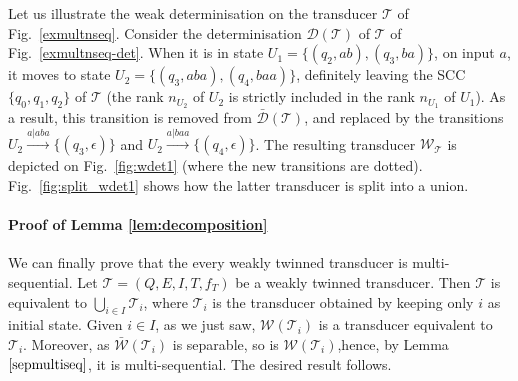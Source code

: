 \documentclass[envcountsame]{llncs}
\newcommand\tra{\mathcal{T}}
\begin{document}
\begin{example}
Let us illustrate the weak determinisation on the transducer $\tra$ of
Fig.~\ref{exmultnseq}. Consider the determinisation
$\mathcal{D}(\tra)$ of $\tra$ of Fig.~\ref{exmultnseq-det}.
When it is in state $U_1 = \{(q_2,ab),(q_3,ba)\}$, on input $a$, it moves to
state $U_2 = \{(q_3,aba),(q_4,baa)\}$, definitely leaving the SCC
$\{q_0,q_1,q_2\}$ of $\tra$ (the rank $n_{U_2}$ of $U_2$ is
strictly included in the rank $n_{U_1}$ of $U_1$). As a result, this
transition is removed from $\bar{\mathcal{D}}(\tra)$, and replaced by the
transitions $U_2\xrightarrow{a|aba} \{ (q_3,\epsilon)\}$ and
$U_2\xrightarrow{a|baa} \{ (q_4,\epsilon)\}$. The resulting transducer
$\mathcal{W}_\tra$ is depicted on Fig.~\ref{fig:wdet1} (where the new
transitions are dotted). Fig.~\ref{fig:split_wdet1} shows how the
latter transducer is split into a union.
\end{example}




\paragraph{Proof of Lemma \ref{lem:decomposition}} We can finally prove that the every weakly twinned transducer is multi-sequential.
Let $\tra = (Q,E,I,T,f_T)$ be a weakly twinned transducer.
Then $\tra$ is equivalent to $\bigcup_{i \in I}\tra_i$, where $\tra_i$ is the transducer obtained by keeping only $i$ as initial state.
Given $i \in I$, as we just saw, $\mathcal{W}(\tra_i)$ is a transducer equivalent to $\tra_i$.
Moreover, as $\bar{\mathcal{W}}(\tra_i)$ is separable, so is $\mathcal{W}(\tra_i)$,hence, by Lemma $\ref{sepmultiseq}$, it is multi-sequential.
The desired result follows.
\end{document}
